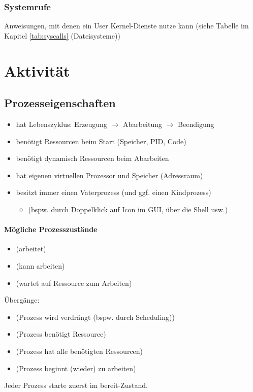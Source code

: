 \subsubsection{Systemrufe}
Anweisungen, mit denen ein User Kernel-Dienste nutze kann (siehe Tabelle im Kapitel \ref{tab:syscalls} (Dateisysteme))

\section{Aktivität}
\subsection{Prozesseigenschaften}
\begin{itemize}
\item hat Lebenszyklus: Erzeugung $\to$ Abarbeitung $\to $ Beendigung
\item benötigt Ressourcen beim Start (Speicher, PID, Code)
\item benötigt dynamisch Ressourcen beim Abarbeiten
\item hat eigenen virtuellen Prozessor und Speicher (Adressraum)
\item besitzt immer einen Vaterprozess (und ggf. einen Kindprozess)
\begin{itemize}
\item {} (bspw. durch Doppelklick auf Icon im GUI, über die Shell usw.)
\end{itemize}
\end{itemize}
\paragraph{Mögliche Prozesszustände}
\begin{itemize}
\item {} (arbeitet)
\item {} (kann arbeiten)
\item {} (wartet auf Ressource zum Arbeiten)
\end{itemize}
Übergänge:
\begin{itemize}
\item {} (Prozess wird verdrängt (bspw. durch Scheduling))
\item {} (Prozess benötigt Ressource)
\item {} (Prozess hat alle benötigten Ressourcen)
\item {} (Prozess beginnt (wieder) zu arbeiten)
\end{itemize}
Jeder Prozess starte zuerst im bereit-Zustand.
